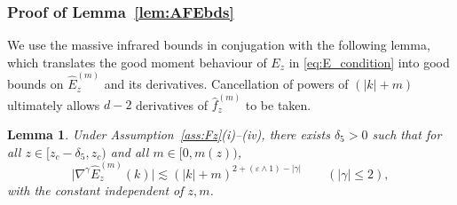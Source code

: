 \documentclass[11pt,hidelinks]{article}
\theoremstyle{plain}
\newtheorem{lemma}[theorem]{Lemma}
\numberwithin{equation}{section}
\newcommand{\eps}{\varepsilon}
\newcommand{\grad}{\nabla}
\renewcommand{\(}{\left(}
\renewcommand{\)}{\right)}
\newcommand{\1}{\mathds{1}}
\providecommand{\abs}[1]{\lvert#1\rvert}
\newcommand{\mz}{m(z)}
\newcommand{\supm}{^{(m)}}
\begin{document}
\subsubsection*{Proof of Lemma~\ref{lem:AFEbds}}
We use the massive infrared bounds in conjugation with the following lemma, 
which translates the good moment behaviour of $E_z$ in \eqref{eq:E_condition}
into good bounds on $\hat E_z\supm$ and its derivatives. 
Cancellation of powers of $(\abs k + m)$ ultimately allows $d-2$ derivatives of $\hat f_z\supm$ to be taken. 

\begin{lemma}
\label{lem:E}
Under Assumption~\ref{ass:Fz}(i)--(iv),
there exists $\delta_5 >0$ such that for all $z \in [ z_c - \delta_5, z_c )$ and all $m \in [0, \mz)$, 
\begin{equation} \label{eq:E_gamma_ub}
\abs{ \grad^\gamma \hat E_z \supm (k) } 
\lesssim  (\abs k  + m)^{2 + (\eps \wedge 1) - \abs \gamma }
\qquad ( \abs \gamma \le 2 ),
\end{equation}
with the constant independent of $z,m$. 
\end{lemma}
\end{document}
